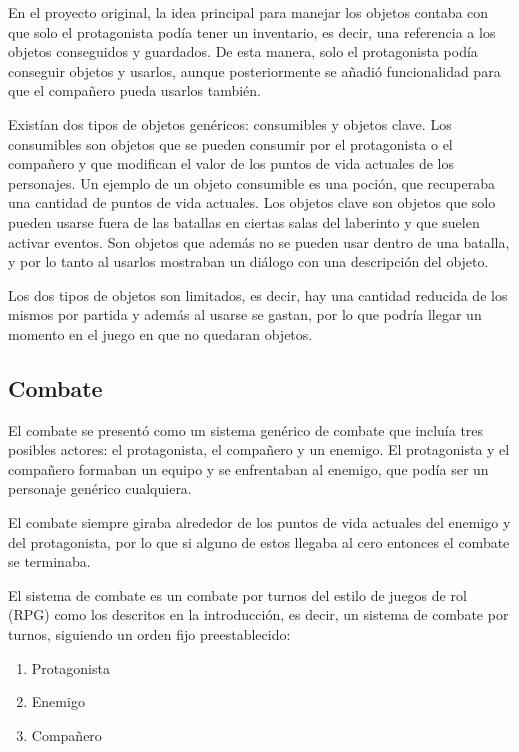 En el proyecto original, la idea principal para manejar los objetos contaba con que solo el protagonista podía tener un inventario, es decir, una referencia a los objetos conseguidos y guardados. De esta manera, solo el protagonista podía conseguir objetos y usarlos, aunque posteriormente se añadió funcionalidad para que el compañero pueda usarlos también.

Existían dos tipos de objetos genéricos: consumibles y objetos clave. 
Los consumibles son objetos que se pueden consumir por el protagonista o el compañero y que modifican el valor de los puntos de vida actuales de los personajes. Un ejemplo de un objeto consumible es una poción, que recuperaba una cantidad de puntos de vida actuales.
Los objetos clave son objetos que solo pueden usarse fuera de las batallas en ciertas salas del laberinto y que suelen activar eventos. Son objetos que además no se pueden usar dentro de una batalla, y por lo tanto al usarlos mostraban un diálogo con una descripción del objeto.

Los dos tipos de objetos son limitados, es decir, hay una cantidad reducida de los mismos por partida y además al usarse se gastan, por lo que podría llegar un momento en el juego en que no quedaran objetos.

\subsection{Combate}

El combate se presentó como un sistema genérico de combate que incluía tres posibles actores: el protagonista, el compañero y un enemigo. El protagonista y el compañero formaban un equipo y se enfrentaban al enemigo, que podía ser un personaje genérico cualquiera.

El combate siempre giraba alrededor de los puntos de vida actuales del enemigo y del protagonista, por lo que si alguno de estos llegaba al cero entonces el combate se terminaba.

El sistema de combate es un combate por turnos del estilo de juegos de rol (RPG) como los descritos en la introducción, es decir, un sistema de combate por turnos, siguiendo un orden fijo preestablecido:
\begin{enumerate}
	\item Protagonista
	\item Enemigo
	\item Compañero
\end{enumerate} 
	
